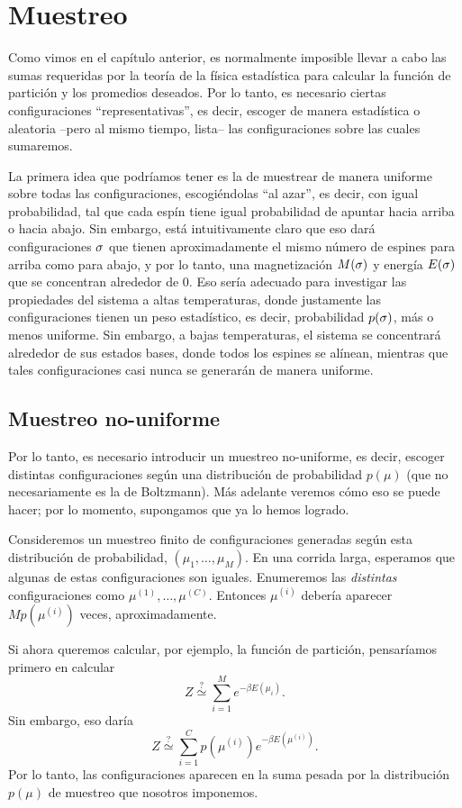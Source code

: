 \chapter{Muestreo}
Como vimos en el capítulo anterior, es normalmente imposible llevar a cabo las
sumas requeridas por la teoría de la física estadística para calcular la
función de partición y los promedios deseados. Por lo tanto, es necesario
 ciertas configuraciones ``representativas'', es decir, escoger
de manera estadística o aleatoria --pero al mismo tiempo, lista-- las
configuraciones sobre las cuales sumaremos.

La primera idea que podríamos tener es la de muestrear de manera uniforme sobre
todas las configuraciones, escogiéndolas ``al azar'', es decir, con igual
probabilidad, tal que cada espín tiene igual probabilidad de apuntar hacia
arriba o hacia abajo.  Sin embargo, está intuitivamente claro que eso dará
configuraciones $\ss$ que tienen aproximadamente el mismo número de espines para
arriba como para abajo, y por lo tanto, una magnetización $M(\ss)$ y energía
$E(\ss)$ que se concentran alrededor de $0$. Eso sería adecuado para investigar
las propiedades del sistema a altas temperaturas, donde justamente las
configuraciones tienen un peso estadístico, es decir, probabilidad $p(\ss)$, más
o menos uniforme. Sin embargo, a bajas temperaturas, el sistema se concentrará
alrededor de sus estados bases, donde todos los espines se alínean, mientras
que tales configuraciones casi nunca se generarán de manera uniforme.

\section{Muestreo no-uniforme}
Por lo tanto, es necesario introducir un muestreo no-uniforme, es decir,
escoger distintas configuraciones según una distribución de probabilidad
$p(\mu)$ (que no necesariamente es la de Boltzmann). Más adelante veremos cómo
eso se puede hacer; por lo momento, supongamos que ya lo hemos logrado.

Consideremos un muestreo finito de configuraciones generadas según esta
distribución de probabilidad, $(\mu_1, \ldots, \mu_M)$. En una corrida larga,
esperamos que algunas de estas configuraciones son iguales. Enumeremos las
\emph{distintas} configuraciones como $\mu^{(1)}, \ldots, \mu^{(C)}$. Entonces
$\mu^{(i)}$ debería aparecer $M p(\mu^{(i)})$ veces, aproximadamente. 

Si ahora queremos calcular, por ejemplo, la función de partición, pensaríamos
primero en calcular
\begin{equation}
Z \stackrel{\textrm{?}}{\simeq} \sum_{i=1}^M e^{-\beta E(\mu_i)}.
\end{equation}
Sin embargo, eso daría
\begin{equation}
Z \stackrel{\textrm{?}}{\simeq} \sum_{i=1}^C p(\mu^{(i)}) e^{-\beta
E(\mu^{(i)})}.
\end{equation}
Por lo tanto, las configuraciones aparecen en la suma pesada por la
distribución $p(\mu)$ de muestreo que nosotros imponemos.

